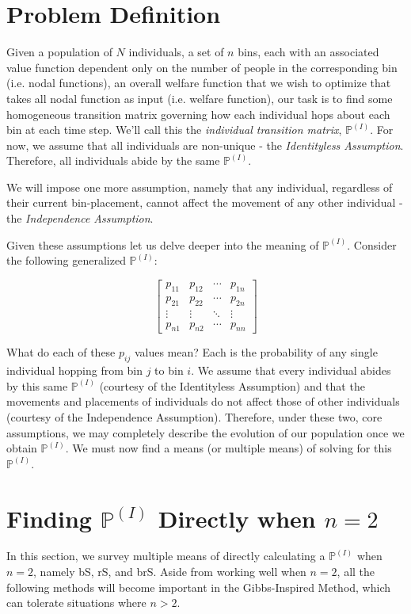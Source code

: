 \documentclass{article}
\begin{document}
\cite{weakComps}

\section{Problem Definition}
Given a population of $N$ individuals, a set of $n$ bins, each with an associated value function dependent only on the number of people in the corresponding bin (i.e. nodal functions), an overall welfare function that we wish to optimize that takes all nodal function as input (i.e. welfare function), our task is to find some homogeneous transition matrix governing how each individual hops about each bin at each time step. We'll call this the \textit{individual transition matrix}, $\mathbb{P}^{(I)}$. For now, we assume that all individuals are non-unique - the \textit{Identityless Assumption}. Therefore, all individuals abide by the same $\mathbb{P}^{(I)}$.

We will impose one more assumption, namely that any individual, regardless of their current bin-placement, cannot affect the movement of any other individual - the \textit{Independence Assumption}.

Given these assumptions let us delve deeper into the meaning of $\mathbb{P}^{(I)}$. Consider the following generalized $\mathbb{P}^{(I)}$:

\[
\begin{bmatrix}
    p_{11} & p_{12} & \cdots & p_{1n} \\
    p_{21} & p_{22} & \cdots & p_{2n} \\
    \vdots & \vdots & \ddots & \vdots \\
    p_{n1} & p_{n2} & \cdots & p_{nn}
\end{bmatrix}
\]

What do each of these $p_{ij}$ values mean? Each is the probability of any single individual hopping from bin $j$ to bin $i$. We assume that every individual abides by this same $\mathbb{P}^{(I)}$ (courtesy of the Identityless Assumption) and that the movements and placements of individuals do not affect those of other individuals (courtesy of the Independence Assumption). Therefore, under these two, core assumptions, we may completely describe the evolution of our population once we obtain $\mathbb{P}^{(I)}$. We must now find a means (or multiple means) of solving for this $\mathbb{P}^{(I)}$.

\section{Finding $\mathbb{P}^{(I)}$ Directly when $n=2$}
In this section, we survey multiple means of directly calculating a $\mathbb{P}^{(I)}$ when $n=2$, namely bS, rS, and brS. Aside from working well when $n=2$, all the following methods will become important in the Gibbs-Inspired Method, which can tolerate situations where $n>2$.
\end{document}

